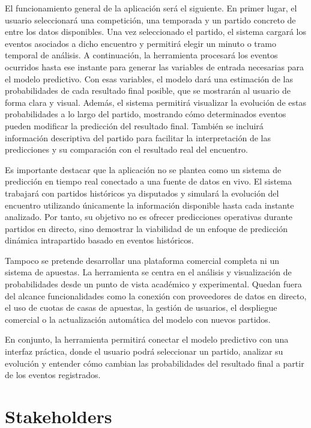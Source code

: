 El funcionamiento general de la aplicación será el siguiente. En primer lugar, el usuario seleccionará una competición, una temporada y un partido concreto de entre los datos disponibles. Una vez seleccionado el partido, el sistema cargará los eventos asociados a dicho encuentro y permitirá elegir un minuto o tramo temporal de análisis. A continuación, la herramienta procesará los eventos ocurridos hasta ese instante para generar las variables de entrada necesarias para el modelo predictivo. Con esas variables, el modelo dará una estimación de las probabilidades de cada resultado final posible, que se mostrarán al usuario de forma clara y visual. Además, el sistema permitirá visualizar la evolución de estas probabilidades a lo largo del partido, mostrando cómo determinados eventos pueden modificar la predicción del resultado final. También se incluirá información descriptiva del partido para facilitar la interpretación de las predicciones y su comparación con el resultado real del encuentro.

Es importante destacar que la aplicación no se plantea como un sistema de predicción en tiempo real conectado a una fuente de datos en vivo. El sistema trabajará con partidos históricos ya disputados y simulará la evolución del encuentro utilizando únicamente la información disponible hasta cada instante analizado. Por tanto, su objetivo no es ofrecer predicciones operativas durante partidos en directo, sino demostrar la viabilidad de un enfoque de predicción dinámica intrapartido basado en eventos históricos.

Tampoco se pretende desarrollar una plataforma comercial completa ni un sistema de apuestas. La herramienta se centra en el análisis y visualización de probabilidades desde un punto de vista académico y experimental. Quedan fuera del alcance funcionalidades como la conexión con proveedores de datos en directo, el uso de cuotas de casas de apuestas, la gestión de usuarios, el despliegue comercial o la actualización automática del modelo con nuevos partidos.

En conjunto, la herramienta permitirá conectar el modelo predictivo con una interfaz práctica, donde el usuario podrá seleccionar un partido, analizar su evolución y entender cómo cambian las probabilidades del resultado final a partir de los eventos registrados.

\section{Stakeholders}

